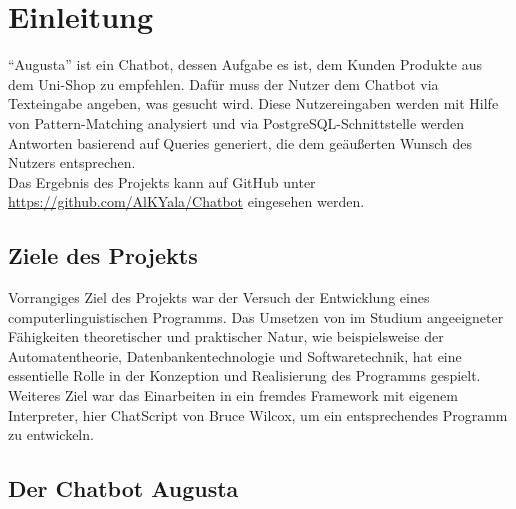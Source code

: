 \chapter{Einleitung}
\label{sec:Einleitung}

"`Augusta"' ist ein Chatbot, dessen Aufgabe es ist, dem Kunden Produkte aus dem Uni-Shop zu empfehlen. Dafür muss der Nutzer dem Chatbot via Texteingabe angeben, was gesucht wird. Diese Nutzereingaben werden mit Hilfe von Pattern-Matching analysiert und via PostgreSQL-Schnittstelle werden Antworten basierend auf Queries generiert, die dem geäußerten Wunsch des Nutzers entsprechen.\\
Das Ergebnis des Projekts kann auf GitHub unter \url{https://github.com/AlKYala/Chatbot} eingesehen werden.\\


\section{Ziele des Projekts}
\label{sec:ZielDesProjekts}

Vorrangiges Ziel des Projekts war der Versuch der Entwicklung eines computerlinguistischen Programms. Das Umsetzen von im Studium angeeigneter Fähigkeiten theoretischer und praktischer Natur, wie beispielsweise der Automatentheorie, Datenbankentechnologie und Softwaretechnik, hat eine essentielle Rolle in der Konzeption und Realisierung des Programms gespielt. Weiteres Ziel war das Einarbeiten in ein fremdes Framework mit eigenem Interpreter, hier ChatScript \citep{chatscript2019} von Bruce Wilcox, um ein entsprechendes Programm zu entwickeln.\\


\section{Der Chatbot Augusta}
\label{sec:Augusta}

